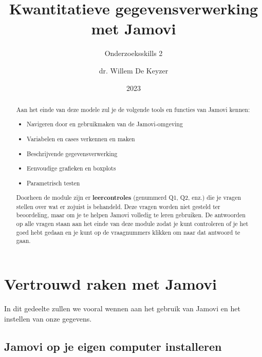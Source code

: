 \documentclass[
  letterpaper,
  DIV=11,
  numbers=noendperiod]{scrartcl}
\title{Kwantitatieve gegevensverwerking met Jamovi}
\subtitle{Onderzoeksskills 2}
\author{dr. Willem De Keyzer}
\date{2023}
\providecommand{\tightlist}{%
  \setlength{\itemsep}{0pt}\setlength{\parskip}{0pt}}\usepackage{longtable,booktabs,array}
\begin{document}
\maketitle
\begin{abstract}
Aan het einde van deze modele zul je de volgende tools en functies van
Jamovi kennen:

\begin{itemize}
\tightlist
\item
  Navigeren door en gebruikmaken van de Jamovi-omgeving
\item
  Variabelen en cases verkennen en maken
\item
  Beschrijvende gegevensverwerking
\item
  Eenvoudige grafieken en boxplots
\item
  Parametrisch testen
\end{itemize}

\begin{tcolorbox}[beforeafter skip=1cm, ignore nobreak=true, breakable, colframe=Questions-frame, colback=Questions-bg, coltext=Questions-text, boxsep=2mm, arc=0mm, boxrule=0.5mm]

Doorheen de module zijn er \textbf{leercontroles} (genummerd Q1, Q2,
enz.) die je vragen stellen over wat er zojuist is behandeld. Deze
vragen worden niet gesteld ter beoordeling, maar om je te helpen Jamovi
volledig te leren gebruiken. De antwoorden op alle vragen staan aan het
einde van deze module zodat je kunt controleren of je het goed hebt
gedaan en je kunt op de vraagnummers klikken om naar dat antwoord te
gaan.

\end{tcolorbox}
\end{abstract}
\ifdefined\Shaded\renewenvironment{Shaded}{\begin{tcolorbox}[breakable, frame hidden, interior hidden, enhanced, borderline west={3pt}{0pt}{shadecolor}, sharp corners, boxrule=0pt]}{\end{tcolorbox}}\fi

\hypertarget{vertrouwd-raken-met-jamovi}{%
\section{Vertrouwd raken met Jamovi}\label{vertrouwd-raken-met-jamovi}}

In dit gedeelte zullen we vooral wennen aan het gebruik van Jamovi en
het instellen van onze gegevens.

\hypertarget{jamovi-op-je-eigen-computer-installeren}{%
\subsection{Jamovi op je eigen computer
installeren}\label{jamovi-op-je-eigen-computer-installeren}}
\end{document}
